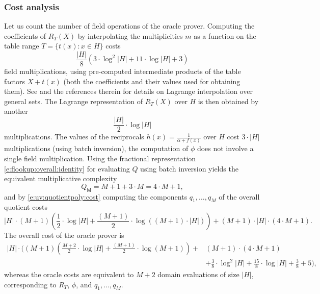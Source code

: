 \subsubsection*{Cost analysis}

Let us count the number of field operations of the oracle prover.
Computing the coefficients of $R_T(X)$ by interpolating the multiplicities $m$ as a function on the table range $T=\{t(x) : x\in H\}$ costs 
\[
\frac{|H|}{8} \left(3\cdot \log^2|H| + 11\cdot\log|H| + 3 \right)
\] 
field multiplications, using pre-computed intermediate products of the table factors $X + t(x)$ (both the coefficients and their values used for obtaining them). 
See \cite{flookup} and the references therein for details on Lagrange interpolation over general sets.
The Lagrange representation of $R_T(X)$ over $H$ is then obtained by another 
\[
\frac{|H|}{2} \cdot \log |H|
\]
multiplications.
The values of the reciprocals $h(x) = \frac{1}{\alpha + f(x)}$ over $H$ cost $3\cdot |H|$ multiplications (using batch inversion), the computation of $\phi$ does not involve a single field multiplication.
Using the fractional representation \eqref{e:flookup:overall:identity} for evaluating $Q$ using batch inversion yields the equivalent multiplicative complexity
\[
Q_\mathsf M = M + 1 +3\cdot M = 4\cdot M + 1,
\]
and by \eqref{e:uv:quotientpoly:cost} computing the components $q_1, \ldots, q_M$ of the overall quotient costs 
\[
|H|\cdot (M+1) \left(\frac{1}{2} \cdot\log|H| + \frac{(M+1)}{2} \cdot\log((M+1)\cdot|H|) \right)+ (M+1)\cdot |H|\cdot (4\cdot M + 1). 
\]
The overall cost of the oracle prover is 
\begin{equation}
\label{e:uv:flookup:cost}
\begin{aligned}
|H|\cdot \Bigg((M+1) \left(\frac{M+2}{2} \cdot\log|H| + \frac{(M+1)}{2} \cdot\log(M+1) \right) + &(M+1) \cdot (4\cdot M + 1)
\\
&+ \frac{3}{8}\cdot \log^2|H| + \frac{15}{8}\cdot\log|H| + \frac{3}{8} + 5
\Bigg),
\end{aligned}
\end{equation}
whereas the oracle costs are equivalent to $M+2$ domain evaluations of size $|H|$, corresponding to $R_T$, $\phi$, and $q_1, \ldots, q_M$.

